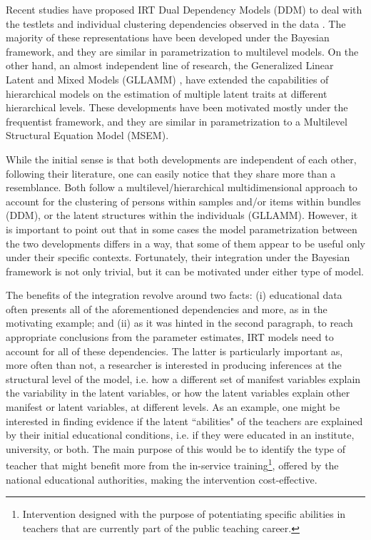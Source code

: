 Recent studies have proposed IRT Dual Dependency Models (DDM) to deal with the testlets and individual clustering dependencies observed in the data \cite{Fujimoto_2020, Fujimoto_2018a, Fujimoto_2018b, Jiao_et_al_2012, Flores_2012, Fox_2010, Reckase_2009, Bradlow_1999}. The majority of these representations have been developed under the Bayesian framework, and they are similar in parametrization to multilevel models. On the other hand, an almost independent line of research, the Generalized Linear Latent and Mixed Models (GLLAMM) \cite{Rabe_et_al_2004a, Rabe_et_al_2004b, Skrondal_et_al_2004a, Rabe_et_al_2012}, have extended the capabilities of hierarchical models on the estimation of multiple latent traits at different hierarchical levels. These developments have been motivated mostly under the frequentist framework, and they are similar in parametrization to a Multilevel Structural Equation Model (MSEM).

While the initial sense is that both developments are independent of each other, following their literature, one can easily notice that they share more than a resemblance. Both follow a multilevel/hierarchical multidimensional approach to account for the clustering of persons within samples and/or items within bundles (DDM), or the latent structures within the individuals (GLLAMM). However, it is important to point out that in some cases the model parametrization between the two developments differs in a way, that some of them appear to be useful only under their specific contexts. Fortunately, their integration under the Bayesian framework is not only trivial, but it can be motivated under either type of model.

The benefits of the integration revolve around two facts: (i) educational data often presents all of the aforementioned dependencies and more, as in the motivating example; and (ii) as it was hinted in the second paragraph, to reach appropriate conclusions from the parameter estimates, IRT models need to account for all of these dependencies. The latter is particularly important as, more often than not, a researcher is interested in producing inferences at the structural level of the model, i.e. how a different set of manifest variables explain the variability in the latent variables, or how the latent variables explain other manifest or latent variables, at different levels. As an example, one might be interested in finding evidence if the latent ``abilities" of the teachers are explained by their initial educational conditions, i.e. if they were educated in an institute, university, or both. The main purpose of this would be to identify the type of teacher that might benefit more from the in-service training\footnote{Intervention designed with the purpose of potentiating specific abilities in teachers that are currently part of the public teaching career.}, offered by the national educational authorities, making the intervention cost-effective.

